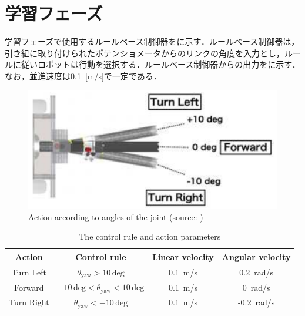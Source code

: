 
\section{学習フェーズ}

  学習フェーズで使用するルールベース制御器をに示す．ルールベース制御器は，引き紐に取り付けられたポテンショメータからのリンクの角度を入力とし，ルールに従いロボットは行動を選択する．ルールベース制御器からの出力をに示す．なお，並進速度は0.1 \,[m/s]で一定である．

  \begin{figure}[h]
    \centering
    \includegraphics[keepaspectratio, scale=1.1] {images/pdf/okada_rule-based_contoroller}
    \caption[Action according to angles of the joint]{Action according to angles of the joint (source: \cite{okada})}
    \label{Fig:okada_rule-based_contoroller}
  \end{figure}

  \vspace{1cm}

  \begin{table}[ht]
    \caption{The control rule and action parameters}
    \label{tab:actions_control_parameters}
    \centering
    \begin{tabular}{cccc}
    \hline
    Action & Control rule & Linear velocity & Angular velocity \\ 
    \hline
    \hline
    Turn Left & $\theta_{\mathrm{yaw}} > 10 \, \mathrm{deg}$ & 0.1 \,m/s & 0.2 \,rad/s \\ 
    Forward & $-10 \, \mathrm{deg} < \theta_{\mathrm{yaw}} < 10 \, \mathrm{deg}$ & 0.1 \,m/s & 0 \,rad/s \\ 
    Turn Right & $\theta_{\mathrm{yaw}} < -10 \, \mathrm{deg}$ & 0.1 \,m/s & -0.2 \,rad/s \\ 
    \hline
    \end{tabular}
    \end{table}
  
\newpage